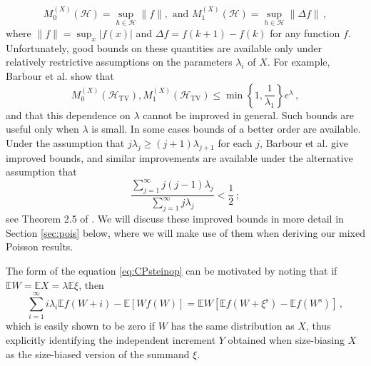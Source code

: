 \documentclass[12pt]{article}
\begin{document}
\begin{equation}\label{eq:SteinFactorDef}
M_0^{(X)}(\mathcal{H})=\sup_{h\in\mathcal{H}}\lVert f\rVert,\text{ and }M_1^{(X)}(\mathcal{H})=\sup_{h\in\mathcal{H}}\lVert \Delta f\rVert\,,
\end{equation}
where $\lVert f\rVert=\sup_{x}|f(x)|$ and $\Delta f=f(k+1)-f(k)$ for any function $f$. Unfortunately, good bounds on these quantities are available only under relatively restrictive assumptions on the parameters $\lambda_i$ of $X$. For example, Barbour et al$.$ \cite[Theorem 4]{barbour92_paper} show that 
\[
M_0^{(X)}(\mathcal{H}_{\text{TV}}),M_1^{(X)}(\mathcal{H}_{\text{TV}})\leq\min\left\{1,\frac{1}{\lambda_1}\right\}e^\lambda\,,
\]
and that this dependence on $\lambda$ cannot be improved in general. Such bounds are useful only when $\lambda$ is small. In some cases bounds of a better order are available. Under the assumption that $j\lambda_j\geq(j+1)\lambda_{j+1}$ for each $j$, Barbour et al$.$ \cite[Theorem 5]{barbour92_paper} give improved bounds, and similar improvements are available under the alternative assumption that 
\begin{equation}\label{eq:bx99}
\frac{\sum_{j=1}^\infty j(j-1)\lambda_j}{\sum_{j=1}^\infty j\lambda_j}<\frac{1}{2}\,;
\end{equation}
see Theorem 2.5 of \cite{barbour99}. We will discuss these improved bounds in more detail in Section \ref{sec:pois} below, where we will make use of them when deriving our mixed Poisson results.  

The form of the equation \eqref{eq:CPsteinop} can be motivated by noting that if $\mathbb{E}W=\mathbb{E}X=\lambda\mathbb{E}\xi$, then
\[
\sum_{i=1}^\infty i\lambda_i\mathbb{E}f(W+i)-\mathbb{E}[Wf(W)]=\mathbb{E}W\left[\mathbb{E}f(W+\xi^\text{s})-\mathbb{E}f(W^\text{s})\right]\,,
\]
which is easily shown to be zero if $W$ has the same distribution as $X$, thus explicitly identifying the independent increment $Y$ obtained when size-biasing $X$ as the size-biased version of the summand $\xi$. 
\end{document}
